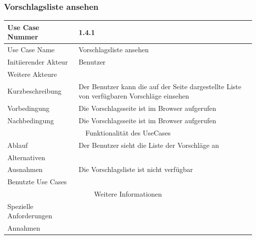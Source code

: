 \documentclass[10pt,a4paper]{article}
\begin{document}
	\subsubsection{Vorschlagsliste ansehen}
	\begin{tabular}{|l|p{.5\linewidth}|}
		\hline Use Case Nummer & 1.4.1 \\ 
		\hline Use Case Name & Vorschlagsliste ansehen \\ 
		\hline Initiierender Akteur & Benutzer \\
		\hline Weitere Akteure & \\
		\hline Kurzbeschreibung & Der Benutzer kann die auf der Seite dargestellte Liste von verf\"ugbaren Vorschl\"age einsehen \\
		\hline Vorbedingung & Die Vorschlagsseite ist im Browser aufgerufen \\
		\hline Nachbedingung & Die Vorschlagsseite ist im Browser aufgerufen \\
		\hline \multicolumn{2}{|c|}{Funktionalität des UseCases}\\
		\hline Ablauf & Der Benutzer sieht die Liste der Vorschl\"age an\\
		\hline Alternativen &  \\
		\hline Ausnahmen & Die Vorschlagsliste ist nicht verf\"ugbar \\
		\hline Benutzte Use Cases & \\
		\hline \multicolumn{2}{|c|}{Weitere Informationen} \\
		\hline Spezielle Anforderungen &  \\
		\hline Annahmen &  \\
		\hline
	\end{tabular}	
	
\end{document}
